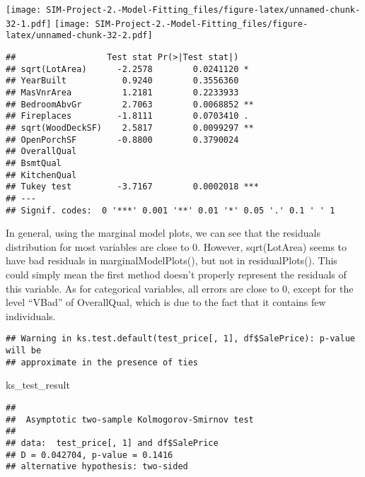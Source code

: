 \documentclass[
]{article}
\newenvironment{Shaded}{\begin{snugshade}}{\end{snugshade}}
\newcommand{\DecValTok}[1]{\textcolor[rgb]{0.00,0.00,0.81}{#1}}
\newcommand{\FunctionTok}[1]{\textcolor[rgb]{0.13,0.29,0.53}{\textbf{#1}}}
\newcommand{\NormalTok}[1]{#1}
\newcommand{\OtherTok}[1]{\textcolor[rgb]{0.56,0.35,0.01}{#1}}
\newcommand{\SpecialCharTok}[1]{\textcolor[rgb]{0.81,0.36,0.00}{\textbf{#1}}}
\begin{document}
\texttt{[image: SIM-Project-2.-Model-Fitting\_files/figure-latex/unnamed-chunk-32-1.pdf]}
\texttt{[image: SIM-Project-2.-Model-Fitting\_files/figure-latex/unnamed-chunk-32-2.pdf]}

\begin{verbatim}
##                  Test stat Pr(>|Test stat|)    
## sqrt(LotArea)      -2.2578        0.0241120 *  
## YearBuilt           0.9240        0.3556360    
## MasVnrArea          1.2181        0.2233933    
## BedroomAbvGr        2.7063        0.0068852 ** 
## Fireplaces         -1.8111        0.0703410 .  
## sqrt(WoodDeckSF)    2.5817        0.0099297 ** 
## OpenPorchSF        -0.8800        0.3790024    
## OverallQual                                    
## BsmtQual                                       
## KitchenQual                                    
## Tukey test         -3.7167        0.0002018 ***
## ---
## Signif. codes:  0 '***' 0.001 '**' 0.01 '*' 0.05 '.' 0.1 ' ' 1
\end{verbatim}

In general, using the marginal model plots, we can see that the
residuals distribution for most variables are close to 0. However,
sqrt(LotArea) seems to have bad residuals in marginalModelPlots(), but
not in residualPlots(). This could simply mean the first method doesn't
properly represent the residuals of this variable. As for categorical
variables, all errors are close to 0, except for the level ``VBad'' of
OverallQual, which is due to the fact that it contains few individuals.

\begin{Shaded}
\end{Shaded}

\begin{verbatim}
## Warning in ks.test.default(test_price[, 1], df$SalePrice): p-value will be
## approximate in the presence of ties
\end{verbatim}

\begin{Shaded}
\begin{Highlighting}[]
\NormalTok{ks\_test\_result}
\end{Highlighting}
\end{Shaded}

\begin{verbatim}
## 
##  Asymptotic two-sample Kolmogorov-Smirnov test
## 
## data:  test_price[, 1] and df$SalePrice
## D = 0.042704, p-value = 0.1416
## alternative hypothesis: two-sided
\end{verbatim}
\end{document}
